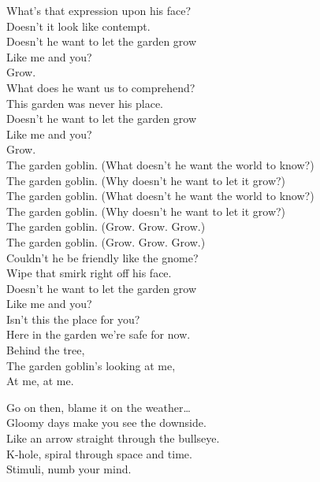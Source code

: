 What's that expression upon his face? \\
Doesn't it look like contempt. \\
Doesn't he want to let the garden grow \\
Like me and you? \\
Grow. \\

What does he want us to comprehend? \\
This garden was never his place. \\
Doesn't he want to let the garden grow \\
Like me and you? \\
Grow. \\

The garden goblin. (What doesn't he want the world to know?) \\
The garden goblin. (Why doesn't he want to let it grow?) \\
The garden goblin. (What doesn't he want the world to know?) \\
The garden goblin. (Why doesn't he want to let it grow?) \\
The garden goblin. (Grow. Grow. Grow.) \\
The garden goblin. (Grow. Grow. Grow.) \\

Couldn't he be friendly like the gnome? \\
Wipe that smirk right off his face. \\
Doesn't he want to let the garden grow \\
Like me and you? \\

Isn't this the place for you? \\
Here in the garden we're safe for now. \\
Behind the tree, \\
The garden goblin's looking at me, \\
At me, at me. \\





Go on then, blame it on the weather… \\

Gloomy days make you see the downside. \\
Like an arrow straight through the bullseye. \\
K-hole, spiral through space and time. \\
Stimuli, numb your mind. \\

